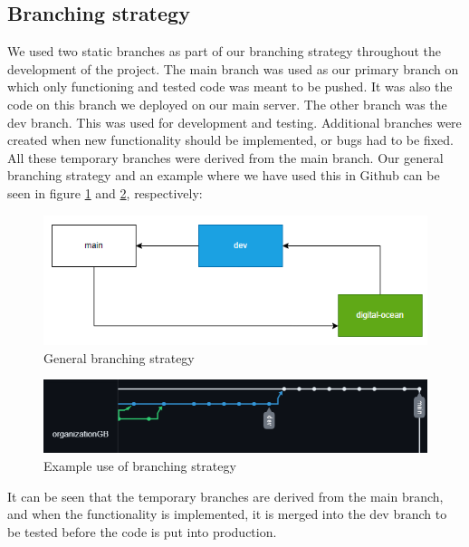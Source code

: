 \subsection{Branching strategy} \label{branching}
We used two static branches as part of our branching strategy throughout the development of the project. 
The main branch was used as our primary branch on which only functioning and tested code was meant to be pushed. It was
also the code on this branch we deployed on our main server. The other branch was the dev branch. This was used for 
development and testing. Additional branches were created when new functionality should be implemented, or bugs had to be
fixed. All these temporary branches were derived from the main branch. Our general branching strategy and an example where
we have used this in Github can be seen in figure \ref{fig:gen_branch} and \ref{fig:ex_branch}, respectively:

\begin{figure}[H]
    \centering
    \captionsetup{justification=centering,margin=1cm}
    \includegraphics[width=0.7\linewidth]{report/images/branching.png}
    \caption{General branching strategy}
    \label{fig:gen_branch}
\end{figure}

\begin{figure}[H]
    \centering
    \captionsetup{justification=centering,margin=1cm}
    \includegraphics[width=0.7\linewidth]{report/images/git_branching.png}
    \caption{Example use of branching strategy}
    \label{fig:ex_branch}
\end{figure}

It can be seen that the temporary branches are derived from the main branch, and when the functionality is implemented, 
it is merged into the dev branch to be tested before the code is put into production. 

